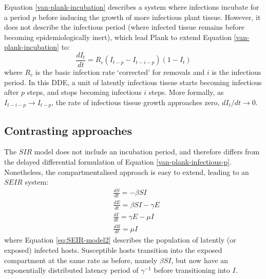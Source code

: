 Equation \ref{van-plank-incubation} describes a system where
infections incubate for a period $p$ before inducing the growth of more infectious plant tissue.
However, it does not describe the infectious period (where infected tissue remains before becoming epidemiologically inert),
which lead Plank to extend Equation \ref{van-plank-incubation} to:
\begin{equation}
\label{van-plank-infectious-p}
    \frac{dI_t}{dt} = R_c(I_{t-p} - I_{t-i-p})(1 - I_{t})
\end{equation}
where $R_c$ is the basic infection rate `corrected' for removals and $i$ is the infectious period.
In this DDE, a unit of latently infectious tissue starts becoming infectious after $p$ steps, and stops becoming infectious $i$ steps.
More formally, as $I_{t-i-p} \rightarrow I_{t-p}$, the rate of infectious tissue growth approaches zero, $dI_t/dt \rightarrow 0$.

\subsection{Contrasting approaches}

The $SIR$ model does not include an incubation period, and therefore differs from the delayed differential formulation 
of Equation \ref{van-plank-infectious-p}. Nonetheless, the compartmentalised approach is easy to extend, leading to an 
$SEIR$ system:
\begin{align}
\label{eq:SEIR-model1}
    &\frac{dS}{dt} = -\beta SI \\
\label{eq:SEIR-model2}
    &\frac{dE}{dt} = \beta SI - \gamma E\\
    &\frac{dI}{dt} = \gamma E - \mu I \\
    \label{eq:SEIR-model3}
    &\frac{dR}{dt} = \mu I
\end{align}
where Equation \ref{eq:SEIR-model2} describes the population of latently (or exposed) infected hosts.
Susceptible hosts transition into the exposed compartment at the same rate as before, namely $\beta SI$, but now have an
exponentially distributed latency period of $\gamma^{-1}$ before transitioning into $I$.

